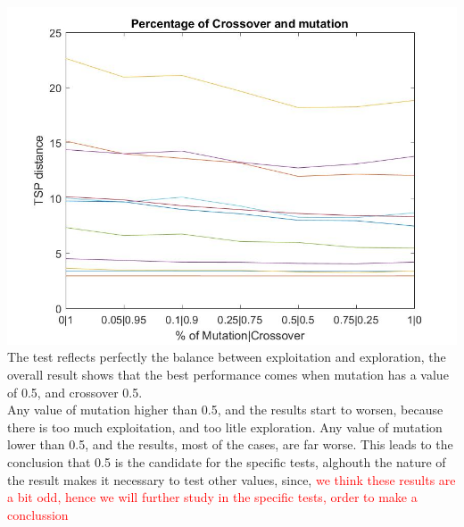 \includegraphics[width=\textwidth]{img/xalt_edges/crossMut.jpg}\\
The test reflects perfectly the balance between exploitation and
exploration, the overall result shows that the best performance comes when
mutation has a value of 0.5, and crossover 0.5.\\
Any value of mutation higher than 0.5, and the results start to worsen, because
there is too much exploitation, and too litle exploration. Any value of mutation
lower than 0.5, and the results, most of the cases, are far worse. This leads to
the conclusion that 0.5 is the candidate for the specific tests, alghouth
the nature of the result makes it necessary to test other values, since,
\textcolor{red}{we think these results are a bit odd, hence we will further
study in the specific tests, order to make a conclussion}


